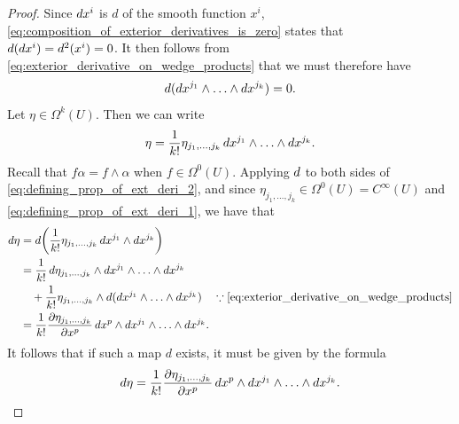\documentclass[notoc,notitlepage]{tufte-book}
\begin{document}
\begin{proof}
  Since $\mathop{}\!d{x^i}$ is $d$ of the smooth function $x^i$,
  \cref{eq:composition_of_exterior_derivatives_is_zero} states that $\mathop{}\!d{(\mathop{}\!d{x^i})} =
  \mathop{}\!d{^2(x^i)} = 0$. It then follows from \cref{eq:exterior_derivative_on_wedge_products}
  that we must therefore have
  \begin{equation}\label{eq:defining_prop_of_ext_deri_1}
    \mathop{}\!d{(\mathop{}\!d{x^{j_1}} \land \hdots \land \mathop{}\!d{x^{j_k}})} = 0.
  \end{equation}
  Let $\eta \in \Omega^k(U)$. Then we can write
  \begin{equation}\label{eq:defining_prop_of_ext_deri_2}
    \eta = \frac{1}{k!} \eta_{j_1, \ldots, j_k}  \mathop{}\!d{x^{j_1}} \land \hdots \land
      \mathop{}\!d{x^{j_k}}.
  \end{equation}
  Recall that $f \alpha = f \land \alpha$ when $f \in \Omega^0(U)$. Applying $\mathop{}\!d{}$ to
  both sides of \cref{eq:defining_prop_of_ext_deri_2}, and since $\eta_{j_1, \ldots, j_k}
  \in \Omega^0(U) = C^\infty(U)$ and \cref{eq:defining_prop_of_ext_deri_1}, we have that
  \begin{align*}
    \dif{\eta} &= \dif{\left( \frac{1}{k!} \eta_{j_1, \ldots, j_k} \dif{x^{j_1}} \land
                \dif{x^{j_k}} \right)} \\
               &= \frac{1}{k!} \dif{\eta_{j_1, \ldots, j_k}} \land \dif{x^{j_1}} \land
                \hdots \land \dif{x^{j_k}} \\
               &\quad + \frac{1}{k!} \eta_{j_1, \ldots, j_k} \land
                \dif{(\dif{x^{j_1}} \land \hdots \land \dif{x^{j_k}})} \quad \because
                \cref{eq:exterior_derivative_on_wedge_products} \\
               &= \frac{1}{k!} \frac{\partial \eta_{j_1, \ldots, j_k}}{\partial x^p}
                \dif{x^p} \land \dif{x^{j_1}} \land \hdots \land \dif{x^{j_k}}.
  \end{align*}
  It follows that if such a map $d$ exists, it must be given by the formula
  \begin{equation}\label{eq:defining_prop_of_ext_deri_defn}
    \mathop{}\!d{\eta} = \frac{1}{k!} \frac{\partial \eta_{j_1, \ldots, j_k}}{\partial x^p}
    \mathop{}\!d{x^p} \land \mathop{}\!d{x^{j_1}} \land \hdots \land \mathop{}\!d{x^{j_k}}.
  \end{equation}
  

\end{proof}
\end{document}
